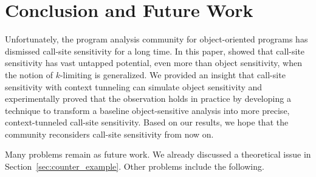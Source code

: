 
\section{Conclusion and Future Work}

Unfortunately, the program analysis community for object-oriented programs has dismissed call-site sensitivity for a long time. 
In this paper, 
showed that 
call-site sensitivity has vast untapped potential, even more than object sensitivity, when the notion of $k$-limiting is generalized. We provided an insight that call-site sensitivity with context tunneling can simulate object sensitivity and experimentally proved that the observation holds in practice by developing a technique to transform a baseline object-sensitive analysis into more precise, context-tunneled call-site sensitivity. 
Based on our results, we hope that the community reconsiders call-site sensitivity from now on.  





Many problems remain as future work. We already discussed a theoretical issue in Section~\ref{sec:counter_example}. 
Other problems include the following. 


